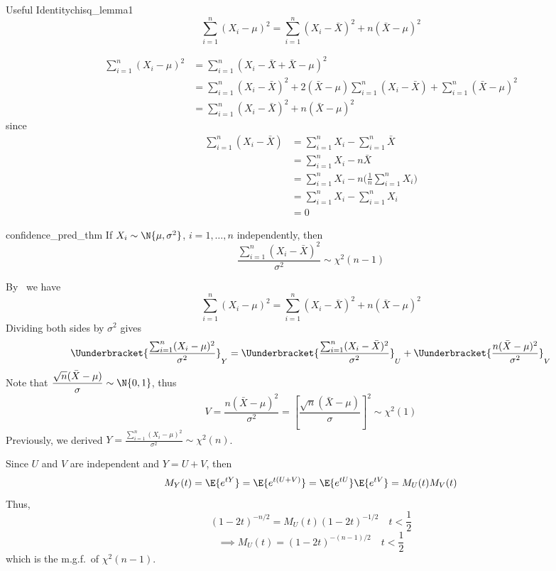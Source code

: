 \begin{Lemma}{Useful Identity}{chisq_lemma1}
    \[ \sum_{i=1}^{n} (X_i-\mu)^2=\sum_{i=1}^{n} (X_i-\bar{X})^2+n(\bar{X}-\mu)^2 \]
\end{Lemma}
\begin{Proof}{}{}
    \begin{align*}
        \sum_{i=1}^{n} (X_i-\mu)^2
         & =\sum_{i=1}^{n} (X_i-\bar{X}+\bar{X}-\mu)^2                                                               \\
         & =\sum_{i=1}^{n} (X_i-\bar{X})^2+2(\bar{X}-\mu)\sum_{i=1}^{n} (X_i-\bar{X})+\sum_{i=1}^{n} (\bar{X}-\mu)^2 \\
         & =\sum_{i=1}^{n} (X_i-\bar{X})^2+n(\bar{X}-\mu)^2
    \end{align*}
    since
    \begin{align*}
        \sum_{i=1}^{n} (X_i-\bar{X})
         & =\sum_{i=1}^{n} X_i-\sum_{i=1}^{n} \bar{X}                        \\
         & =\sum_{i=1}^{n} X_i-n\bar{X}                                      \\
         & =\sum_{i=1}^{n} X_i-n\biggl(\frac{1}{n} \sum_{i=1}^{n} X_i\biggr) \\
         & =\sum_{i=1}^{n} X_i-\sum_{i=1}^{n} X_i                            \\
         & =0
    \end{align*}
\end{Proof}
\begin{Theorem}{}{confidence_pred_thm}
    If $ X_i \sim \N{\mu,\sigma^2} $, $ i=1,\ldots,n $ independently, then
    \[ \frac{\sum_{i=1}^{n} (X_i-\bar{X})^2}{\sigma^2} \sim \chi^2(n-1)  \]
\end{Theorem}
\begin{Proof}{}{}
    By~ we have
    \[ \sum_{i=1}^{n} (X_i-\mu)^2=\sum_{i=1}^{n} (X_i-\bar{X})^2+n(\bar{X}-\mu)^2 \]
    Dividing both sides by $ \sigma^2 $ gives
    \[ \Uunderbracket{\frac{\sum_{i=1}^{n} (X_i-\mu)^2}{\sigma^2}}_{Y}
        =
        \Uunderbracket{\frac{\sum_{i=1}^{n} (X_i-\bar{X})^2}{\sigma^2}}_{U}
        +
        \Uunderbracket{\frac{n(\bar{X}-\mu)^2}{\sigma^2}}_{V}  \]
    Note that $ \displaystyle \frac{\sqrt{n}(\bar{X}-\mu)}{\sigma} \sim \N{0,1} $, thus
    \[ V=\frac{n(\bar{X}-\mu)^2}{\sigma^2}=
        \left[ \frac{\sqrt{n}(\bar{X}-\mu)}{\sigma} \right]^2 \sim \chi^2(1)  \]
    Previously, we derived $
        Y=\displaystyle \frac{\sum_{i=1}^{n} (X_i-\mu)^2}{\sigma^2}\sim \chi^2(n) $.

    Since $ U $ and $ V $ are independent and $ Y=U+V $, then
    \[ M_Y(t)=\E{e^{tY}}=\E{e^{t(U+V)}}=\E{e^{tU}}\E{e^{tV}}=M_U(t)M_V(t) \]
    Thus,
    \[ (1-2t)^{-n/2}=M_U(t)(1-2t)^{-1/2}\quad t<\frac{1}{2} \]
    \[ \implies M_U(t)=(1-2t)^{-(n-1)/2}\quad t<\frac{1}{2} \]
    which is the m.g.f.\ of $ \chi^2(n-1) $.
\end{Proof}
